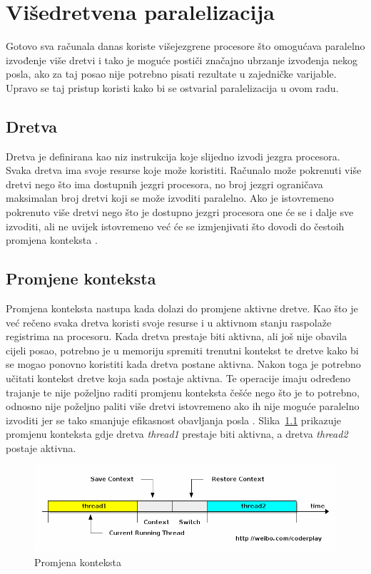 \documentclass[times, utf8, zavrsni]{fer}
\begin{document}
\chapter{Višedretvena paralelizacija}
Gotovo sva računala danas koriste višejezgrene procesore što omogućava paralelno izvođenje više dretvi i tako je moguće postiči značajno ubrzanje izvođenja nekog posla, ako za taj posao nije potrebno pisati rezultate u zajedničke varijable. Upravo se taj pristup koristi kako bi se ostvarial paralelizacija u ovom radu.

\section{Dretva}
Dretva je definirana kao niz instrukcija koje slijedno izvodi jezgra procesora. Svaka dretva ima svoje resurse koje može koristiti. Računalo može pokrenuti više dretvi nego što ima dostupnih jezgri procesora, no broj jezgri ograničava maksimalan broj dretvi koji se može izvoditi paralelno. Ako je istovremeno pokrenuto više dretvi nego što je dostupno jezgri procesora one će se i dalje sve izvoditi, ali ne uvijek istovremeno već će se izmjenjivati što dovodi do čestoih promjena konteksta \citep{os}.

\section{Promjene konteksta}
Promjena konteksta  nastupa kada dolazi do promjene aktivne dretve. Kao što je već rečeno svaka dretva koristi svoje resurse i u aktivnom stanju raspolaže registrima na procesoru. Kada dretva prestaje biti aktivna, ali još nije obavila cijeli posao, potrebno je u memoriju spremiti trenutni kontekst te dretve kako bi se mogao ponovno koristiti kada dretva postane aktivna. Nakon toga je potrebno učitati kontekst dretve koja sada postaje aktivna. Te operacije imaju određeno trajanje te nije poželjno raditi promjenu konteksta češće nego što je to potrebno, odnosno nije poželjno paliti više dretvi istovremeno ako ih nije moguće paralelno izvoditi jer se tako smanjuje efikasnost obavljanja posla \citep{os}. Slika~\ref{fig:contextSwitching} prikazuje promjenu konteksta gdje dretva \textit{thread1} prestaje biti aktivna, a dretva \textit{thread2} postaje aktivna.

\begin{figure}[htb]
	\centering
	\includegraphics[width=\linewidth]{figures/contextSwitching.png}
	\caption{Promjena konteksta\protect\footnotemark}
	\label{fig:contextSwitching}
\end{figure}
\end{document}
